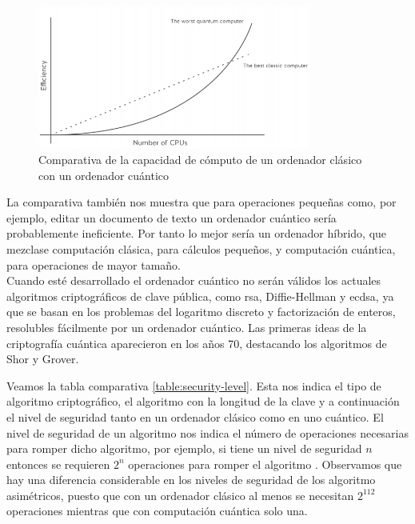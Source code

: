 \begin{figure}[h]
	\centering
	\includegraphics[width=0.8\textwidth]{figuras/comp_clasica_cuantica.png}
	\caption{Comparativa de la capacidad de cómputo de un ordenador clásico con un ordenador cuántico\cite{clasica-vs-cuantica}}
	\label{fig:comp-clasica-cuantica}
\end{figure}

La comparativa también nos muestra que para operaciones pequeñas como, por ejemplo, editar un documento de texto un ordenador cuántico sería probablemente ineficiente. Por tanto lo mejor sería un ordenador híbrido, que mezclase computación clásica, para cálculos pequeños, y computación cuántica, para operaciones de mayor tamaño.\\

Cuando esté desarrollado el ordenador cuántico no serán válidos los actuales algoritmos criptográficos de clave pública, como \acrshort{rsa}, Diffie-Hellman y \mbox{\acrshort{ecdsa}}, ya que se basan en los problemas del logaritmo discreto y factorización de enteros, resolubles fácilmente por un ordenador cuántico. Las primeras ideas de la criptografía cuántica aparecieron en los años 70, destacando los algoritmos de Shor y Grover.

Veamos la tabla comparativa \ref{table:security-level}. Esta nos indica el tipo de algoritmo criptográfico, el algoritmo con la longitud de la clave y a continuación el nivel de seguridad tanto en un ordenador clásico como en uno cuántico. El nivel de seguridad de un algoritmo nos indica el número de operaciones necesarias para romper dicho algoritmo, por ejemplo, si tiene un nivel de seguridad $n$ entonces se requieren $2^n$ operaciones para romper el algoritmo \cite{security-level}. Observamos que hay una diferencia considerable en los niveles de seguridad de los algoritmo asimétricos, puesto que con un ordenador clásico al menos se necesitan $2^{112}$ operaciones mientras que con computación cuántica solo una. \\

